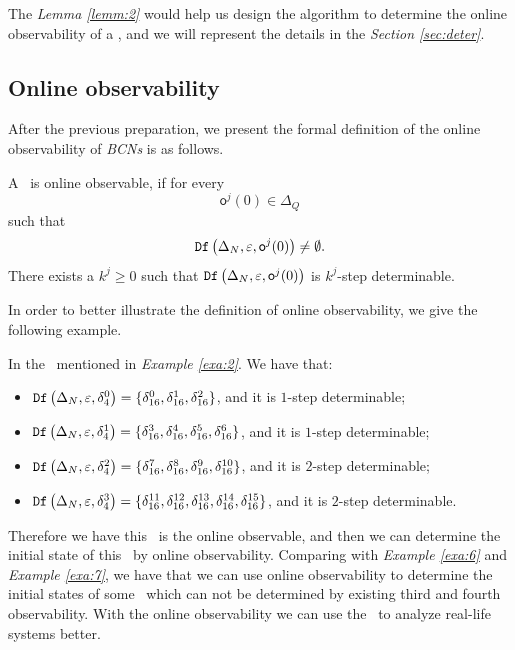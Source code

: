 The {\em Lemma \ref{lemm:2}} would help us design the algorithm to determine the online observability of a \BCN, and we will represent the details in the {\em Section \ref{sec:deter}}.

\subsection{Online observability}
After the previous preparation, we present the formal definition of the online observability of {\em BCNs} is as follows.

\begin{definition}
 A \BCN\ is online observable,
if for every \[\mathsf{o}^{j}(0)\in \Delta_Q\] such that \[{\tt Df}\left(\Delta_N,\varepsilon, \mathsf{o}^{j}(0)\right)\ne \emptyset.\] There exists a $k^{j}\ge0$ such that ${\tt Df}\left(\Delta_N,\varepsilon,\mathsf{o}^{j}(0)\right)$ is $k^{j}$-step determinable.
\end{definition}

 In order to better illustrate the definition of online observability, we give the following example.

\begin{example}
In the \BCN\ mentioned in {\em Example \ref{exa:2}}.  We have that:
 \begin{itemize}
 \item ${\tt Df}\left(\Delta_N,\varepsilon, \delta_{4}^0\right)=\{\delta_{16}^0,\delta_{16}^1,\delta_{16}^2\}$, and it is $1$-step determinable;
 \item ${\tt Df}\left(\Delta_N,\varepsilon, \delta_{4}^1\right)=\{\delta_{16}^3,\delta_{16}^4,\delta_{16}^5,\delta_{16}^6\}$, and it is $1$-step determinable;
 \item ${\tt Df}\left(\Delta_N,\varepsilon, \delta_{4}^2\right)=\{\delta_{16}^7,\delta_{16}^8,\delta_{16}^{9},\delta_{16}^{10}\}$, and it is $2$-step determinable;
 \item ${\tt Df}\left(\Delta_N,\varepsilon, \delta_{4}^3\right)=\{\delta_{16}^{11},\delta_{16}^{12},\delta_{16}^{13},\delta_{16}^{14},\delta_{16}^{15}\}$, and it is $2$-step determinable.
 \end{itemize}
 
Therefore we have this \BCN\ is the online observable, and then we can determine the initial state of this \BCN\ by online observability. Comparing with {\em Example \ref{exa:6}} and {\em Example \ref{exa:7}}, we have that we can use online observability to determine the initial states of some \BCNs\ which can not be determined by existing third and fourth observability. With the online observability we can use the \BCN\ to analyze real-life systems better.
\label{exa:10}
\end{example}  

